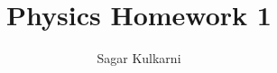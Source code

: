 \begin{titlepage}
    \title{Physics Homework 1}
    \author{Sagar Kulkarni}
    \maketitle

\end{titlepage}